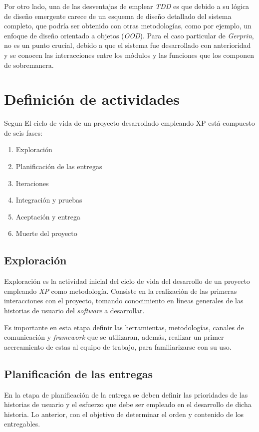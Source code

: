 Por otro lado, una de las desventajas de emplear \textit{TDD} es que debido a su lógica de diseño emergente carece de un esquema de diseño detallado del sistema completo, que podría ser obtenido con otras metodologías, como por ejemplo, un enfoque de diseño orientado a objetos (\textit{OOD}).  Para el caso particular de \textit{Gerprin}, no es un punto crucial, debido a que el sistema fue desarrollado con anterioridad y se conocen las interacciones entre los módulos y las funciones que los componen de sobremanera.

\section{Definición de actividades}

Segun \citet{pdf05}El ciclo de vida de un proyecto desarrollado empleando XP está compuesto de seis fases:  

\begin{enumerate}
	\item Exploración
	\item Planificación de las entregas
	\item Iteraciones
	\item Integración y pruebas
	\item Aceptación y entrega
	\item Muerte del proyecto
\end{enumerate}

\subsection{Exploración}

Exploración es la actividad inicial del ciclo de vida del desarrollo de un proyecto empleando \textit{XP} como metodología. Consiste en la realización de las primeras interacciones con el proyecto, tomando conocimiento en líneas generales de las historias de usuario del \textit{software} a desarrollar. 

Es importante en esta etapa definir las herramientas, metodologías, canales de comunicación y \textit{framework} que se utilizaran, además, realizar un primer acercamiento de estas al equipo de trabajo, para familiarizarse con su uso.

\subsection{Planificación de las entregas}

En la etapa de planificación de la entrega se deben definir las prioridades de las historias de usuario y el esfuerzo que debe ser empleado en el desarrollo de dicha historia. Lo anterior, con el objetivo de determinar el orden y contenido de los entregables.

